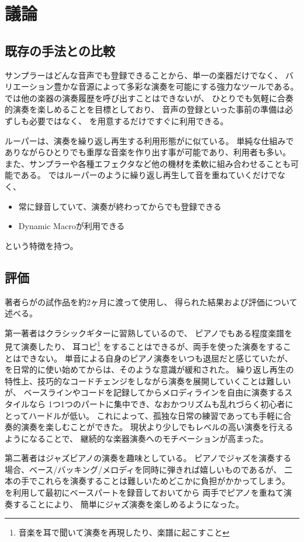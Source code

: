 \section{議論}


\subsection{既存の手法との比較}
サンプラーはどんな音声でも登録できることから、単一の楽器だけでなく、
バリエーション豊かな音源によって多彩な演奏を可能にする強力なツールである。
{\system}では他の楽器の演奏履歴を呼び出すことはできないが、
ひとりでも気軽に合奏的演奏を楽しめることを目標としており、
音声の登録といった事前の準備は必ずしも必要ではなく、
{\system}を用意するだけですぐに利用できる。

ルーパーは、演奏を繰り返し再生する利用形態が{\system}に似ている。
単純な仕組みでありながらひとりでも重厚な音楽を作り出す事が可能であり、利用者も多い。
また、サンプラーや各種エフェクタなど他の機材を柔軟に組み合わせることも可能である。
{\system}ではルーパーのように繰り返し再生して音を重ねていくだけでなく、
\begin{itemize}
\item 常に録音していて、演奏が終わってからでも登録できる
\item Dynamic Macroが利用できる
\end{itemize}
という特徴を持つ。

\subsection{評価}

著者らが{\system}の試作品を約2ヶ月に渡って使用し、
得られた結果および評価について述べる。

第一著者はクラシックギターに習熟しているので、
ピアノでもある程度楽譜を見て演奏したり、
耳コピ\footnote{\textsf{音楽を耳で聞いて演奏を再現したり、楽譜に起こすこと}}
をすることはできるが、両手を使った演奏をすることはできない。
単音による自身のピアノ演奏をいつも退屈だと感じていたが、
{\system}を日常的に使い始めてからは、そのような意識が緩和された。
繰り返し再生の特性上、技巧的なコードチェンジをしながら演奏を展開していくことは難しいが、
ベースラインやコードを記録してからメロディラインを自由に演奏するスタイルなら
1つ1つのパートに集中でき、なおかつリズムも乱れづらく初心者にとってハードルが低い。
これによって、孤独な日常の練習であっても手軽に合奏的演奏を楽しむことができた。
現状より少しでもレベルの高い演奏を行えるようになることで、
継続的な楽器演奏へのモチベーションが高まった。

第二著者はジャズピアノの演奏を趣味としている。
ピアノでジャズを演奏する場合、ベース/バッキング/メロディを同時に弾きれば嬉しいものであるが、
二本の手でこれらを演奏することは難しいためどこかに負担がかかってしまう。
{\system}を利用して最初にベースパートを録音しておいてから
両手でピアノを重ねて演奏することにより、
簡単にジャズ演奏を楽しめるようになった。
